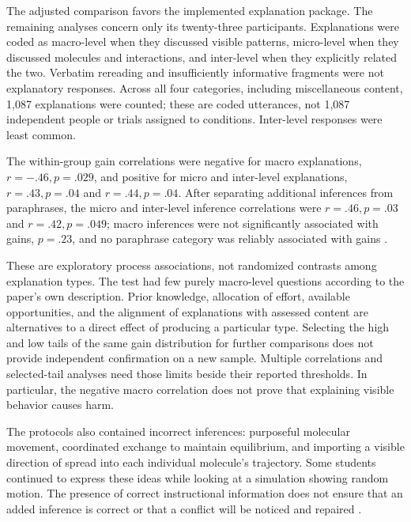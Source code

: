 The adjusted comparison favors the implemented explanation package.
The remaining analyses concern only its twenty-three participants.
Explanations were coded as macro-level when they discussed visible patterns,
micro-level when they discussed molecules and interactions, and inter-level
when they explicitly related the two. Verbatim rereading and insufficiently
informative fragments were not explanatory responses. Across all four
categories, including miscellaneous content, 1,087 explanations were counted;
these are coded utterances, not 1,087 independent people or trials assigned
to conditions. Inter-level responses were least common.

The within-group gain correlations were negative for macro explanations,
\(r=-.46,p=.029\), and positive for micro and inter-level explanations,
\(r=.43,p=.04\) and \(r=.44,p=.04\). After separating additional
inferences from paraphrases, the micro and inter-level inference correlations
were \(r=.46,p=.03\) and \(r=.42,p=.049\); macro inferences were not
significantly associated with gains, \(p=.23\), and no paraphrase category
was reliably associated with gains
\cite[pp.~851--852]{MuldnerBurlesonChi2014Emergent}.

These are exploratory process associations, not randomized contrasts among
explanation types. The test had few purely macro-level questions according
to the paper's own description. Prior knowledge, allocation of effort,
available opportunities, and the alignment of explanations with assessed
content are alternatives to a direct effect of producing a particular
type. Selecting the high and low tails of the same gain distribution for
further comparisons does not provide independent confirmation on a new
sample. Multiple correlations and selected-tail analyses need those limits
beside their reported thresholds. In particular, the negative macro
correlation does not prove that explaining visible behavior causes harm.

The protocols also contained incorrect inferences: purposeful molecular
movement, coordinated exchange to maintain equilibrium, and importing a
visible direction of spread into each individual molecule's trajectory.
Some students continued to express these ideas while looking at a simulation
showing random motion. The presence of correct instructional information
does not ensure that an added inference is correct or that a conflict will
be noticed and repaired
\cite[pp.~852--853]{MuldnerBurlesonChi2014Emergent}.


